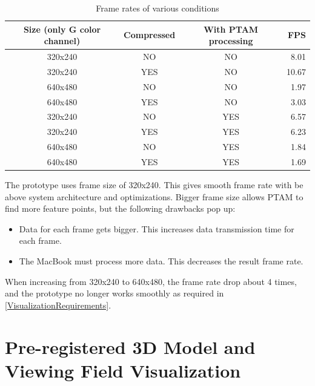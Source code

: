 \begin{table}[tb]
	\begin{center}
		\begin{tabular}{|c|c|c|r|}
			\hline
			Size (only G color channel) & Compressed & With PTAM processing & FPS   \\
			\hline
			320x240 & NO         & NO                   &  8.01 \\
			320x240 & YES        & NO                   & 10.67 \\
			640x480 & NO         & NO                   &  1.97 \\
			640x480 & YES        & NO                   &  3.03 \\
			320x240 & NO         & YES                  &  6.57 \\
			320x240 & YES        & YES                  &  6.23 \\
			640x480 & NO         & YES                  &  1.84 \\
			640x480 & YES        & YES                  &  1.69 \\
			\hline
		\end{tabular}
		\caption{Frame rates of various conditions}
	\end{center}
\end{table}

The prototype uses frame size of 320x240. This gives smooth frame rate with be above system architecture and optimizations. Bigger frame size allows PTAM to find more feature points, but the following drawbacks pop up:

\begin{itemize}
	\item Data for each frame gets bigger. This increases data transmission time for each frame.
	\item The MacBook must process more data. This decreases the result frame rate.
\end{itemize}

When increasing from 320x240 to 640x480, the frame rate drop about 4 times, and the prototype no longer works smoothly as required in \ref{VisualizationRequirements}.


\section{Pre-registered 3D Model and Viewing Field Visualization}
\label{3DModel}

